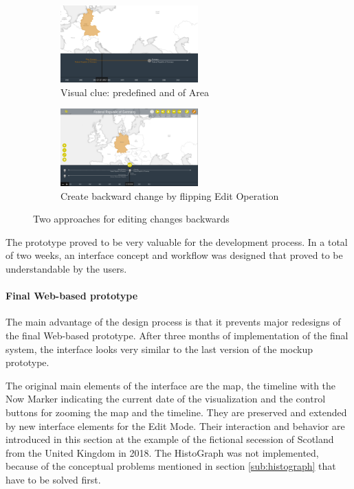 \begin{figure}[H]
\centering
\begin{subfigure}[b]{.5\textwidth}
  \centering
  \includegraphics[width=200px]{graphics/development/design_process/backward_change_1.png}
  \caption{Visual clue: predefined and of Area}
  \label{sfig:backward_change_1}
\end{subfigure}%
\begin{subfigure}[b]{.5\textwidth}
  \centering
  \includegraphics[width=200px]{graphics/development/design_process/backward_change_2.png}
  \caption{Create backward change by flipping Edit Operation}
  \label{sfig:backward_change_2}
\end{subfigure}
\caption{Two approaches for editing changes backwards}
\label{fig:backward_change}
\end{figure}

The prototype proved to be very valuable for the development process. In a total of two weeks, an interface concept and workflow was designed that proved to be understandable by the users.



\paragraph{Final Web-based prototype} %
\label{par:final_web_based_prototype}

The main advantage of the design process is that it prevents major redesigns of the final Web-based prototype. After three months of implementation of the final system, the interface looks very similar to the last version of the mockup prototype.

The original main elements of the interface are the map, the timeline with the Now Marker indicating the current date of the visualization and the control buttons for zooming the map and the timeline. They are preserved and extended by new interface elements for the Edit Mode. Their interaction and behavior are introduced in this section at the example of the fictional secession of Scotland from the United Kingdom in 2018. The HistoGraph was not implemented, because of the conceptual problems mentioned in section \ref{sub:histograph} that have to be solved first.


